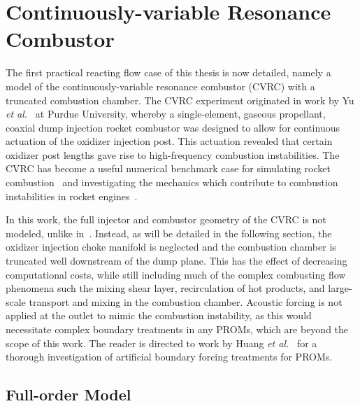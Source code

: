 \section{Continuously-variable Resonance Combustor}\label{sec:cvrc}

The first practical reacting flow case of this thesis is now detailed, namely a model of the continuously-variable resonance combustor (CVRC) with a truncated combustion chamber. The CVRC experiment originated in work by Yu \textit{et al.}~\cite{Yu2008,Yu2009,Yu2012} at Purdue University, whereby a single-element, gaseous propellant, coaxial dump injection rocket combustor was designed to allow for continuous actuation of the oxidizer injection post. This actuation revealed that certain oxidizer post lengths gave rise to high-frequency combustion instabilities. The CVRC has become a useful numerical benchmark case for simulating rocket combustion~\cite{Garby2013,Nguyen2018} and investigating the mechanics which contribute to combustion instabilities in rocket engines~\cite{HarvazinskiCVRCOrig,Harvazinski2016,HarvazinskiCVRCflamelet}.

In this work, the full injector and combustor geometry of the CVRC is not modeled, unlike in~\cite{HarvazinskiCVRCOrig}. Instead, as will be detailed in the following section, the oxidizer injection choke manifold is neglected and the combustion chamber is truncated well downstream of the dump plane. This has the effect of decreasing computational costs, while still including much of the complex combusting flow phenomena such the mixing shear layer, recirculation of hot products, and large-scale transport and mixing in the combustion chamber. Acoustic forcing is not applied at the outlet to mimic the combustion instability, as this would necessitate complex boundary treatments in any PROMs, which are beyond the scope of this work. The reader is directed to work by Huang \textit{et al.}~\cite{Huang2022a} for a thorough investigation of artificial boundary forcing treatments for PROMs.

\subsection{Full-order Model}

